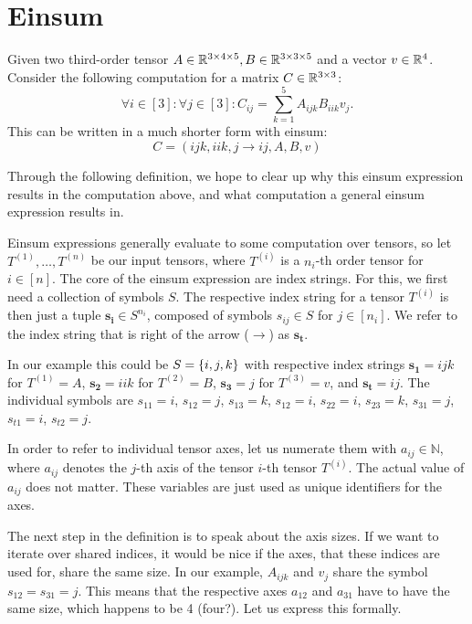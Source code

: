 \section{Einsum}
Given two third-order tensor $A \in \mathbb{R}^{3 \times 4 \times 5}, B \in \mathbb{R}^{3 \times 3 \times 5}$ and a vector $v \in \mathbb{R}^4$.
Consider the following computation for a matrix $C \in \mathbb{R}^{3 \times 3}$:
$$\forall i \in [3]: \forall j \in [3]: C_{ij} = \sum\limits_{k = 1}^{5} A_{ijk} B_{iik} v_j.$$
This can be written in a much shorter form with einsum:
$$C = (ijk, iik, j \rightarrow ij, A, B, v)$$

Through the following definition, we hope to clear up why this einsum expression results in the computation above,
and what computation a general einsum expression results in.

\begin{definition}
    Einsum expressions generally evaluate to some computation over tensors, so let $T^{(1)},\dots,T^{(n)}$ be our input tensors,
    where $T^{(i)}$ is a $n_i$-th order tensor for $i \in [n]$.
    The core of the einsum expression are index strings. For this, we first need a collection of symbols $S$.
    The respective index string for a tensor $T^{(i)}$ is then just a tuple $\bm{s_i} \in S^{n_i}$,
    composed of symbols $s_{ij} \in S$ for $j \in [n_i]$.
    We refer to the index string that is right of the arrow ($\rightarrow$) as $\bm{s_t}$.

    In our example this could be $S = \lbrace i,j,k \rbrace$ with respective index strings
    $\bm{s_1} = ijk$ for $T^{(1)} = A$,
    $\bm{s_2} = iik$ for $T^{(2)} = B$,
    $\bm{s_3} = j$ for $T^{(3)} = v$,
    and $\bm{s_t} = ij$.
    The individual symbols are $s_{11} = i$, $s_{12} = j$, $s_{13} = k$, $s_{12} = i$, $s_{22} = i$, $s_{23} = k$, $s_{31} = j$, $s_{t1} = i$, $s_{t2} = j$.

    In order to refer to individual tensor axes, let us numerate them with $a_{ij} \in \mathbb{N}$,
    where $a_{ij}$ denotes the $j$-th axis of the tensor $i$-th tensor $T^{(i)}$.
    The actual value of $a_{ij}$ does not matter.
    These variables are just used as unique identifiers for the axes.

    The next step in the definition is to speak about the axis sizes.
    If we want to iterate over shared indices, it would be nice if the axes, that these indices are used for, share the same size.
    In our example, $A_{ijk}$ and $v_j$ share the symbol $s_{12} = s_{31} = j$.
    This means that the respective axes $a_{12}$ and $a_{31}$ have to have the same size, which happens to be 4 (four?).
    Let us express this formally.


\end{definition}
